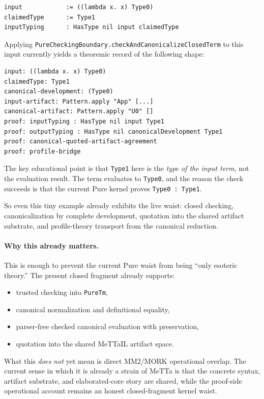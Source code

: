\documentclass[11pt]{article}
\theoremstyle{remark}
\newcommand{\MeTTa}{\textup{MeTTa}}
\newcommand{\MeTTaIL}{\textup{MeTTaIL}}
\newcommand{\MORK}{\textup{MORK}}
\newcommand{\code}[1]{\texttt{#1}}
\newcommand{\leanref}[1]{\texttt{#1}}
\begin{document}
\begin{lstlisting}
input            := ((lambda x. x) Type0)
claimedType      := Type1
inputTyping      : HasType nil input claimedType
\end{lstlisting}

\noindent
Applying
\leanref{PureCheckingBoundary.checkAndCanonicalizeClosedTerm} to this input
currently yields a theoremic record of the following shape:

\begin{lstlisting}
input: ((lambda x. x) Type0)
claimedType: Type1
canonical-development: (Type0)
input-artifact: Pattern.apply "App" [...]
canonical-artifact: Pattern.apply "U0" []
proof: inputTyping : HasType nil input Type1
proof: outputTyping : HasType nil canonicalDevelopment Type1
proof: canonical-quoted-artifact-agreement
proof: profile-bridge
\end{lstlisting}

\noindent
The key educational point is that \code{Type1} here is the \emph{type of the
input term}, not the evaluation result. The term evaluates to \code{Type0}, and
the reason the check succeeds is that the current Pure kernel proves
\code{Type0 : Type1}.

\medskip
\noindent
So even this tiny example already exhibits the live waist:
closed checking, canonicalization by complete development, quotation into the
shared artifact substrate, and profile-theory transport from the canonical
reduction.

\paragraph{Why this already matters.}
This is enough to prevent the current Pure waist from being ``only esoteric
theory.'' The present closed fragment already supports:
\begin{itemize}[nosep]
  \item trusted checking into \leanref{PureTm},
  \item canonical normalization and definitional equality,
  \item parser-free checked canonical evaluation with preservation,
  \item quotation into the shared \MeTTaIL{} artifact space.
\end{itemize}

\noindent
What this \emph{does not} yet mean is direct MM2/\MORK{} operational overlap.
The current sense in which it is already a strain of \MeTTa{} is that the
concrete syntax, artifact substrate, and elaborated-core story are shared, while
the proof-side operational account remains an honest closed-fragment kernel
waist.
\end{document}
